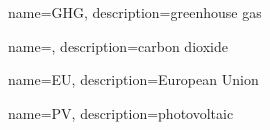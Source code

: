 \makeglossaries

{
    name=GHG,
    description={greenhouse gas}
}

{
    name=,
    description={carbon dioxide}
}

{
    name=EU,
    description={European Union}
}

{
    name=PV,
    description={photovoltaic}
}